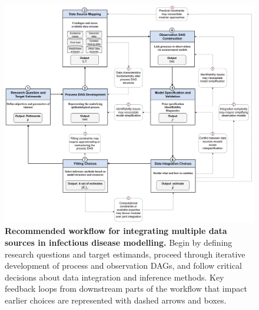 \documentclass{article}
\begin{document}
\begin{figure}[htbp]
    \centering
    \includegraphics[width=\textwidth]{figures/core steps with more details.drawio.pdf}
    \caption{\textbf{Recommended workflow for integrating multiple data sources in infectious disease modelling.} Begin by defining research questions and target estimands, proceed through iterative development of process and observation DAGs, and follow critical decisions about data integration and inference methods. Key feedback loops from downstream parts of the workflow that impact earlier choices are represented with dashed arrows and boxes.}
    \label{fig:workflow}
\end{figure}


\end{document}
